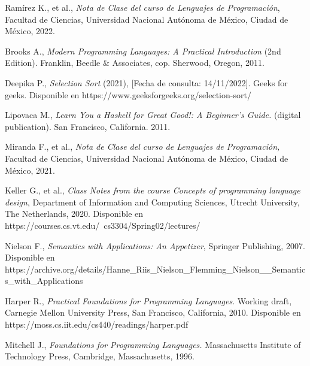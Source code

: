 \begin{thebibliography}{11}

    \label{sec:1}
    \hypertarget{1}{}
    Ramírez K., et al., \textit{Nota de Clase del curso de Lenguajes
    de Programación}, Facultad de Ciencias, Universidad Nacional Autónoma de México, Ciudad de México, 2022.

    
    \label{sec:2}
    \hypertarget{2}{}
    Brooks A., \textit{Modern Programming Languages: A Practical Introduction} (2nd Edition). Franklin, Beedle \& Associates, cop. Sherwood, Oregon, 2011.


    \label{sec:3}
    \hypertarget{3}{}
    Deepika P., \textit{Selection Sort} (2021), [Fecha de consulta: 14/11/2022]. Geeks for geeks. Disponible en https://www.geeksforgeeks.org/selection-sort/
 
    \label{sec:4}
    \hypertarget{4}{}
    Lipovaca M., \textit{Learn You a Haskell for Great Good!: A Beginner's Guide.} (digital publication). San Francisco, California. 2011.
    
    \label{sec:5}
    \hypertarget{5}{}
     Miranda F., et al., \textit{Nota de Clase del curso de Lenguajes de Programación,}
     Facultad de Ciencias, Universidad Nacional Autónoma de México, Ciudad de México, 2021.


    \label{sec:6}
    \hypertarget{6}{}
    Keller G., et al., \textit{Class Notes from the course Concepts of programming language design}, Department of Information and Computing Sciences, Utrecht University, The Netherlands,  2020. Disponible en https://courses.cs.vt.edu/~cs3304/Spring02/lectures/

    
    \label{swann}
    \label{sec:7}
    \hypertarget{7}{}
    Nielson F., \textit{Semantics with Applications: An Appetizer}, Springer Publishing, 2007. Disponible en https://archive.org/details/Hanne\_Riis\_Nielson\_Flemming\_Nielson\_\_Semantics\_with\_Applications

    
    \label{sec:8}
    \hypertarget{8}{}
    Harper R., \textit{Practical Foundations for Programming Languages}. Working draft, Carnegie Mellon University Press, San Francisco, California, 2010. Disponible en https://moss.cs.iit.edu/cs440/readings/harper.pdf

    
    \label{sec:9}
    \hypertarget{9}{}
    Mitchell J., \textit{Foundations for Programming Languages.} Massachusetts Institute of Technology Press, Cambridge, Massachusetts, 1996.
    

\end{thebibliography}
